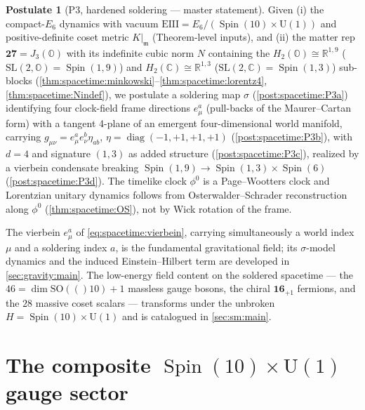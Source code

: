\documentclass[11pt]{article}
\theoremstyle{plain}
\theoremstyle{definition}
\newtheorem{postulate}[theorem]{Postulate}
\theoremstyle{remark}
\newcommand{\SO}[1]{\mathrm{SO}(#1)}
\newcommand{\U}[1]{\mathrm{U}(#1)}
\newcommand{\SL}{\mathrm{SL}}
\newcommand{\Spin}{\operatorname{Spin}}
\newcommand{\diag}{\operatorname{diag}}
\newcommand{\Uone}{\U{1}}
\newcommand{\EIII}{\mathrm{EIII}}
\begin{document}
\begin{postulate}[P3, hardened soldering --- master statement]\label{post:spacetime:P3master}
\label{post:soldering:P3}
Given (i) the compact-$E_6$ dynamics with vacuum $\EIII=E_6/(\Spin(10)\times\Uone)$ and
positive-definite coset metric $K|_{\mathfrak m}$ (Theorem-level inputs), and (ii) the
matter rep $\mathbf{27}=J_3(\mathbb O)$ with its indefinite cubic norm $N$ containing the
$H_2(\mathbb O)\cong\mathbb R^{1,9}$ ($\SL(2,\mathbb O)=\Spin(1,9)$) and
$H_2(\mathbb C)\cong\mathbb R^{1,3}$ ($\SL(2,\mathbb C)=\Spin(1,3)$) sub-blocks
(\autoref{thm:spacetime:minkowski}--\autoref{thm:spacetime:lorentz4},
\autoref{thm:spacetime:Nindef}), we postulate a soldering map $\sigma$
(\autoref{post:spacetime:P3a}) identifying four clock-field frame directions $e^a_\mu$
(pull-backs of the Maurer--Cartan form) with a tangent 4-plane of an emergent
four-dimensional world manifold, carrying $g_{\mu\nu}=e^a_\mu e^b_\nu\eta_{ab}$,
$\eta=\diag(-1,+1,+1,+1)$ (\autoref{post:spacetime:P3b}), with $d=4$ and signature
$(1,3)$ as added structure (\autoref{post:spacetime:P3c}), realized by a vierbein
condensate breaking $\Spin(1,9)\to\Spin(1,3)\times\Spin(6)$
(\autoref{post:spacetime:P3d}). The timelike clock $\phi^0$ is a Page--Wootters clock
and Lorentzian unitary dynamics follows from Osterwalder--Schrader reconstruction along
$\phi^0$ (\autoref{thm:spacetime:OS}), not by Wick rotation of the frame.
\end{postulate}

The vierbein $e^a_\mu$ of \eqref{eq:spacetime:vierbein}, carrying simultaneously a
world index $\mu$ and a soldering index $a$, is the fundamental gravitational field; its
$\sigma$-model dynamics and the induced Einstein--Hilbert term are developed in
\autoref{sec:gravity:main}. The low-energy field content on the soldered spacetime ---
the $46=\dim\SO(10)+1$ massless gauge bosons, the chiral $\mathbf{16}_{+1}$ fermions,
and the $28$ massive coset scalars --- transforms under the unbroken
$H=\Spin(10)\times\Uone$ and is catalogued in \autoref{sec:sm:main}.


\section{The composite \texorpdfstring{$\Spin(10)\times\Uone$}{Spin(10) x U(1)} gauge sector}
\label{sec:gauge:main}
\label{sec:gauge}
\label{sec:anomaly:main}
\end{document}
